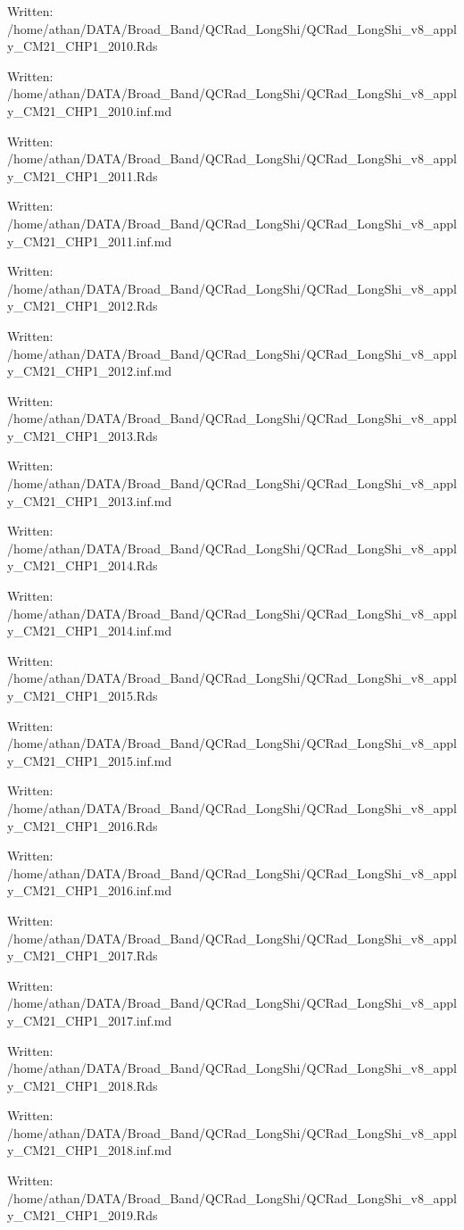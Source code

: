 \documentclass[
  10pt,
  a4paper,oneside]{article}
\begin{document}
Written: /home/athan/DATA/Broad\_Band/QCRad\_LongShi/QCRad\_LongShi\_v8\_apply\_CM21\_CHP1\_2010.Rds

Written: /home/athan/DATA/Broad\_Band/QCRad\_LongShi/QCRad\_LongShi\_v8\_apply\_CM21\_CHP1\_2010.inf.md

Written: /home/athan/DATA/Broad\_Band/QCRad\_LongShi/QCRad\_LongShi\_v8\_apply\_CM21\_CHP1\_2011.Rds

Written: /home/athan/DATA/Broad\_Band/QCRad\_LongShi/QCRad\_LongShi\_v8\_apply\_CM21\_CHP1\_2011.inf.md

Written: /home/athan/DATA/Broad\_Band/QCRad\_LongShi/QCRad\_LongShi\_v8\_apply\_CM21\_CHP1\_2012.Rds

Written: /home/athan/DATA/Broad\_Band/QCRad\_LongShi/QCRad\_LongShi\_v8\_apply\_CM21\_CHP1\_2012.inf.md

Written: /home/athan/DATA/Broad\_Band/QCRad\_LongShi/QCRad\_LongShi\_v8\_apply\_CM21\_CHP1\_2013.Rds

Written: /home/athan/DATA/Broad\_Band/QCRad\_LongShi/QCRad\_LongShi\_v8\_apply\_CM21\_CHP1\_2013.inf.md

Written: /home/athan/DATA/Broad\_Band/QCRad\_LongShi/QCRad\_LongShi\_v8\_apply\_CM21\_CHP1\_2014.Rds

Written: /home/athan/DATA/Broad\_Band/QCRad\_LongShi/QCRad\_LongShi\_v8\_apply\_CM21\_CHP1\_2014.inf.md

Written: /home/athan/DATA/Broad\_Band/QCRad\_LongShi/QCRad\_LongShi\_v8\_apply\_CM21\_CHP1\_2015.Rds

Written: /home/athan/DATA/Broad\_Band/QCRad\_LongShi/QCRad\_LongShi\_v8\_apply\_CM21\_CHP1\_2015.inf.md

Written: /home/athan/DATA/Broad\_Band/QCRad\_LongShi/QCRad\_LongShi\_v8\_apply\_CM21\_CHP1\_2016.Rds

Written: /home/athan/DATA/Broad\_Band/QCRad\_LongShi/QCRad\_LongShi\_v8\_apply\_CM21\_CHP1\_2016.inf.md

Written: /home/athan/DATA/Broad\_Band/QCRad\_LongShi/QCRad\_LongShi\_v8\_apply\_CM21\_CHP1\_2017.Rds

Written: /home/athan/DATA/Broad\_Band/QCRad\_LongShi/QCRad\_LongShi\_v8\_apply\_CM21\_CHP1\_2017.inf.md

Written: /home/athan/DATA/Broad\_Band/QCRad\_LongShi/QCRad\_LongShi\_v8\_apply\_CM21\_CHP1\_2018.Rds

Written: /home/athan/DATA/Broad\_Band/QCRad\_LongShi/QCRad\_LongShi\_v8\_apply\_CM21\_CHP1\_2018.inf.md

Written: /home/athan/DATA/Broad\_Band/QCRad\_LongShi/QCRad\_LongShi\_v8\_apply\_CM21\_CHP1\_2019.Rds
\end{document}
